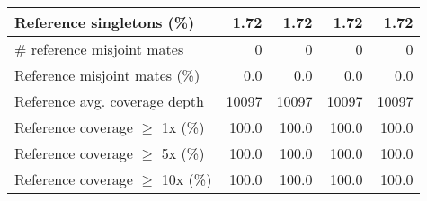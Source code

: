 \documentclass[12pt,a4paper]{article}
\begin{document}
\begin{table}[ht]
\begin{center}
\begin{tabular}{|l*{4}{|r}|}
Reference singletons (\%) & 1.72 & 1.72 & 1.72 & 1.72 \\ \hline
\# reference misjoint mates & 0 & 0 & 0 & 0 \\ \hline
Reference misjoint mates (\%) & 0.0 & 0.0 & 0.0 & 0.0 \\ \hline
Reference avg. coverage depth & 10097 & 10097 & 10097 & 10097 \\ \hline
Reference coverage $\geq$ 1x (\%) & 100.0 & 100.0 & 100.0 & 100.0 \\ \hline
Reference coverage $\geq$ 5x (\%) & 100.0 & 100.0 & 100.0 & 100.0 \\ \hline
Reference coverage $\geq$ 10x (\%) & 100.0 & 100.0 & 100.0 & 100.0 \\ \hline
\end{tabular}
\end{center}
\end{table}
\end{document}
